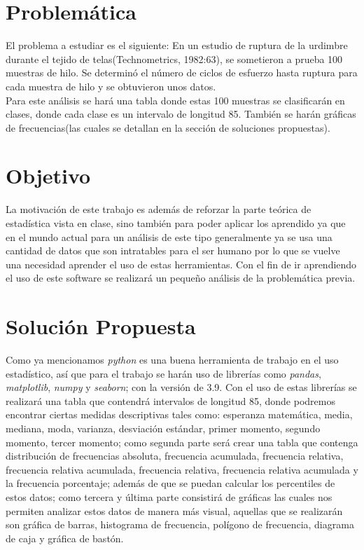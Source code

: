 \documentclass{report}
\begin{document}
\section{Problemática}
El problema a estudiar es el siguiente: En un estudio de ruptura de la urdimbre durante el tejido de telas(Technometrics, 1982:63), se sometieron a prueba 100 muestras de hilo. Se determinó el número de ciclos de esfuerzo hasta ruptura para cada muestra de hilo y se obtuvieron unos datos.\\
Para este análisis se hará una tabla donde estas 100 muestras se clasificarán en clases, donde cada clase es un intervalo de longitud 85. También se harán gráficas de frecuencias(las cuales se detallan en la sección de soluciones propuestas).
\section{Objetivo}
La motivación de este trabajo es además de reforzar la parte teórica de estadística vista en clase, sino también para poder aplicar los aprendido ya que en el mundo actual para un análisis de este tipo generalmente ya se usa una cantidad de datos que son intratables para el ser humano por lo que se vuelve una necesidad aprender el uso de estas herramientas. Con el fin de ir aprendiendo el uso de este software se realizará un pequeño análisis de la problemática previa.
\section{Solución Propuesta}
Como ya mencionamos \textit{python} es una buena herramienta de trabajo en el uso estadístico, así que para el trabajo se harán uso de librerías como \textit{pandas}, \textit{matplotlib}, \textit{numpy} y \textit{seaborn}; con la versión de 3.9. Con el uso de estas librerías se realizará una tabla que contendrá intervalos de longitud 85, donde podremos encontrar ciertas medidas descriptivas tales como: esperanza matemática, media, mediana, moda, varianza, desviación estándar, primer momento, segundo momento, tercer momento; como segunda parte será crear una tabla que contenga distribución de frecuencias absoluta, frecuencia acumulada, frecuencia relativa, frecuencia relativa acumulada, frecuencia relativa, frecuencia relativa acumulada y la frecuencia porcentaje; además de que se puedan calcular los percentiles de estos datos; como tercera y última parte consistirá de gráficas las cuales nos permiten analizar estos datos de manera más visual, aquellas que se realizarán son gráfica de barras, histograma de frecuencia, polígono de frecuencia, diagrama de caja y gráfica de bastón.
\end{document}
